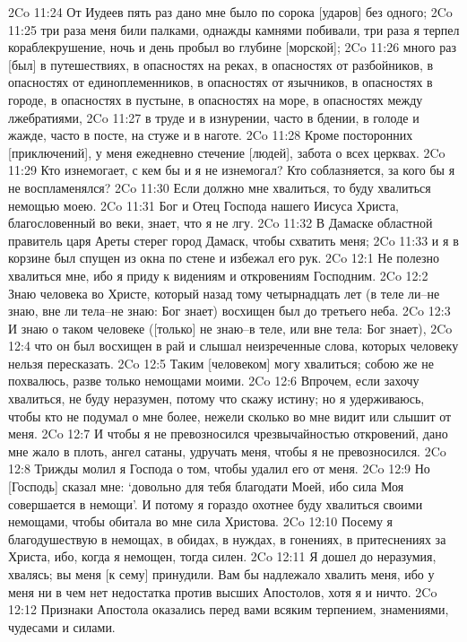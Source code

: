 2Co 11:24  От Иудеев пять раз дано мне было по сорока [ударов] без одного;
2Co 11:25  три раза меня били палками, однажды камнями побивали, три раза я терпел кораблекрушение, ночь и день пробыл во глубине [морской];
2Co 11:26  много раз [был] в путешествиях, в опасностях на реках, в опасностях от разбойников, в опасностях от единоплеменников, в опасностях от язычников, в опасностях в городе, в опасностях в пустыне, в опасностях на море, в опасностях между лжебратиями,
2Co 11:27  в труде и в изнурении, часто в бдении, в голоде и жажде, часто в посте, на стуже и в наготе.
2Co 11:28  Кроме посторонних [приключений], у меня ежедневно стечение [людей], забота о всех церквах.
2Co 11:29  Кто изнемогает, с кем бы и я не изнемогал? Кто соблазняется, за кого бы я не воспламенялся?
2Co 11:30  Если должно мне хвалиться, то буду хвалиться немощью моею.
2Co 11:31  Бог и Отец Господа нашего Иисуса Христа, благословенный во веки, знает, что я не лгу.
2Co 11:32  В Дамаске областной правитель царя Ареты стерег город Дамаск, чтобы схватить меня;
2Co 11:33  и я в корзине был спущен из окна по стене и избежал его рук.
2Co 12:1  Не полезно хвалиться мне, ибо я приду к видениям и откровениям Господним.
2Co 12:2  Знаю человека во Христе, который назад тому четырнадцать лет (в теле ли--не знаю, вне ли тела--не знаю: Бог знает) восхищен был до третьего неба.
2Co 12:3  И знаю о таком человеке ([только] не знаю--в теле, или вне тела: Бог знает),
2Co 12:4  что он был восхищен в рай и слышал неизреченные слова, которых человеку нельзя пересказать.
2Co 12:5  Таким [человеком] могу хвалиться; собою же не похвалюсь, разве только немощами моими.
2Co 12:6  Впрочем, если захочу хвалиться, не буду неразумен, потому что скажу истину; но я удерживаюсь, чтобы кто не подумал о мне более, нежели сколько во мне видит или слышит от меня.
2Co 12:7  И чтобы я не превозносился чрезвычайностью откровений, дано мне жало в плоть, ангел сатаны, удручать меня, чтобы я не превозносился.
2Co 12:8  Трижды молил я Господа о том, чтобы удалил его от меня.
2Co 12:9  Но [Господь] сказал мне: `довольно для тебя благодати Моей, ибо сила Моя совершается в немощи'. И потому я гораздо охотнее буду хвалиться своими немощами, чтобы обитала во мне сила Христова.
2Co 12:10  Посему я благодушествую в немощах, в обидах, в нуждах, в гонениях, в притеснениях за Христа, ибо, когда я немощен, тогда силен.
2Co 12:11  Я дошел до неразумия, хвалясь; вы меня [к сему] принудили. Вам бы надлежало хвалить меня, ибо у меня ни в чем нет недостатка против высших Апостолов, хотя я и ничто.
2Co 12:12  Признаки Апостола оказались перед вами всяким терпением, знамениями, чудесами и силами.
